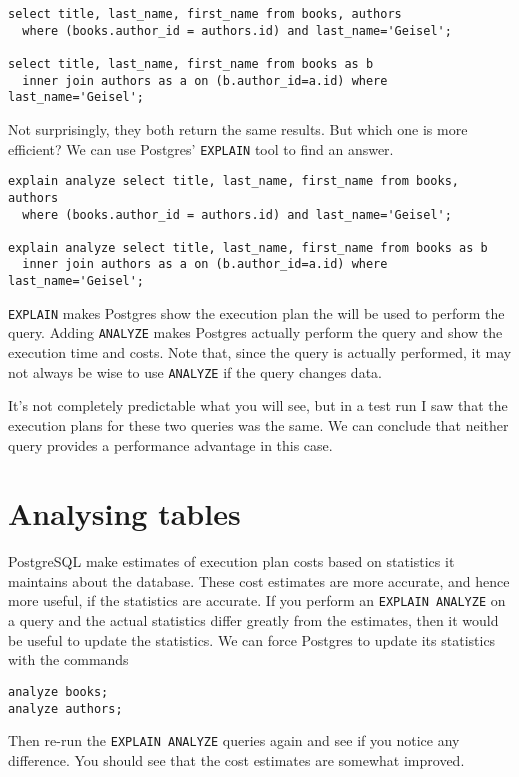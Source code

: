 \documentclass{article}
\begin{document}
\begin{verbatim}
select title, last_name, first_name from books, authors 
  where (books.author_id = authors.id) and last_name='Geisel';

select title, last_name, first_name from books as b 
  inner join authors as a on (b.author_id=a.id) where last_name='Geisel';
\end{verbatim}

Not surprisingly, they both return the same results.  But which one is more efficient?  We can use Postgres' \texttt{EXPLAIN} tool to find an answer.

\begin{verbatim}
explain analyze select title, last_name, first_name from books, authors 
  where (books.author_id = authors.id) and last_name='Geisel';

explain analyze select title, last_name, first_name from books as b 
  inner join authors as a on (b.author_id=a.id) where last_name='Geisel';
\end{verbatim}

\texttt{EXPLAIN} makes Postgres show the execution plan the will be used to perform the query.  Adding \texttt{ANALYZE} makes Postgres actually perform the query and show the execution time and costs.  Note that, since the query is actually performed, it may not always be wise to use \texttt{ANALYZE} if the query changes data.

It's not completely predictable what you will see, but in a test run I saw that the execution plans for these two queries was the same.  We can conclude that neither query provides a performance advantage in this case.

\section{Analysing tables}
PostgreSQL make estimates of execution plan costs based on statistics it maintains about the database.  These cost estimates are more accurate, and hence more useful, if the statistics are accurate.  If you perform an \texttt{EXPLAIN ANALYZE} on a query and the actual statistics differ greatly from the estimates, then it would be useful to update the statistics.  We can force Postgres to update its statistics with the commands

\begin{verbatim}
analyze books;
analyze authors;
\end{verbatim}

Then re-run the \texttt{EXPLAIN ANALYZE} queries again and see if you notice any difference. You should see that the cost estimates are somewhat improved.
\end{document}
